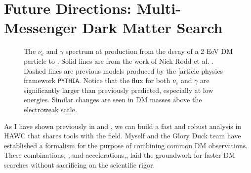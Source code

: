 \section{Future Directions: Multi-Messenger Dark Matter Search}\label{sec:future}

\begin{figure}[h]
    \caption{The $\nu_e$ and $\gamma$ spectrum at production from the decay of a 2 EeV DM particle to . Solid lines are from the work of Nick Rodd et al. \cite{HDMSpectra}. Dashed lines are previous models produced by the [article physics framework \texttt{PYTHIA}. Notice that the flux for both $\nu_e$ and $\gamma$ are significantly larger than previously predicted, especially at low energies. Similar changes are seen in DM masses above the electroweak scale.}
    \label{fig:nu_and_gam}
\end{figure}

As I have shown previously in  and , we can build a fast and robust analysis in HAWC that shares tools with the field.
Myself and the Glory Duck team have established a formalism for the purpose of combining common DM observations.
These combinations, , and accelerations,, laid the groundwork for faster DM searches without sacrificing on the scientific rigor.

